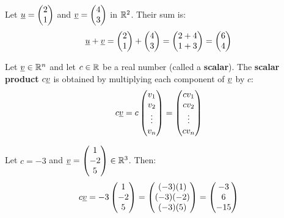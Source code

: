 \begin{example}
    Let $\underline{u} = \begin{pmatrix} 2 \\ 1 \end{pmatrix}$ and $\underline{v} = \begin{pmatrix} 4 \\ 3 \end{pmatrix}$ in $\mathbb{R}^2$. Their sum is:
    \[
        \underline{u} + \underline{v} = \begin{pmatrix} 2 \\ 1 \end{pmatrix} + \begin{pmatrix} 4 \\ 3 \end{pmatrix} = \begin{pmatrix} 2 + 4 \\ 1 + 3 \end{pmatrix} = \begin{pmatrix} 6 \\ 4 \end{pmatrix}
    \]
\end{example}

\begin{definition}
    Let $\underline{v} \in \mathbb{R}^n$ and let $c \in \mathbb{R}$ be a real number (called a \textbf{scalar}). The \textbf{scalar product} $c\underline{v}$ is obtained by multiplying each component of $\underline{v}$ by $c$:
    \[
        c\underline{v} = c\begin{pmatrix} v_1 \\ v_2 \\ \vdots \\ v_n \end{pmatrix} = \begin{pmatrix} c v_1 \\ c v_2 \\ \vdots \\ c v_n \end{pmatrix}
    \]
\end{definition}

\begin{example}
    Let $c = -3$ and $\underline{v} = \begin{pmatrix} 1 \\ -2 \\ 5 \end{pmatrix} \in \mathbb{R}^3$. Then:
    \[
        c\underline{v} = -3 \begin{pmatrix} 1 \\ -2 \\ 5 \end{pmatrix} = \begin{pmatrix} (-3)(1) \\ (-3)(-2) \\ (-3)(5) \end{pmatrix} = \begin{pmatrix} -3 \\ 6 \\ -15 \end{pmatrix}
    \]
\end{example}


